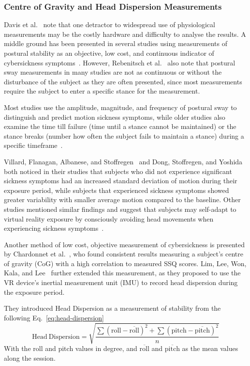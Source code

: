 \subsubsection{Centre of Gravity and Head Dispersion Measurements}\label{subsubsec:centre-of-gravity-and-head-dispersion-measurements}

Davis et al.~\cite{Davis2014} note that one detractor to widespread use of physiological measurements may be the
costly hardware and difficulty to analyse the results.
A middle ground has been presented in several studies using measurements of postural stability as an objective, low
cost, and continuous indicator of cybersickness symptoms~\cite{Rebenitsch2016}.
However, Rebenitsch et al.~\cite{Rebenitsch2016} also note that postural sway measurements in many studies are not as
continuous or without the disturbance of the subject as they are often presented, since most measurements require the
subject to enter a specific stance for the measurement.

Most studies use the amplitude, magnitude, and frequency of postural sway to distinguish and predict motion sickness
symptoms, while older studies also examine the time till failure (time until a stance cannot be maintained) or the
stance breaks (number how often the subject fails to maintain a stance) during a specific
timeframe~\cite{Rebenitsch2016}.

Villard, Flanagan, Albanese, and Stoffregen~\cite{Villard2008} and Dong, Stoffregen, and
Yoshida~\cite{Dong2011, Dong2010} both noticed in their studies that subjects who did not experience significant
sickness symptoms had an increased standard deviation of motion during their exposure period, while subjects that
experienced sickness symptoms showed greater variability with smaller average motion compared to the baseline.
Other studies mentioned similar findings and suggest that subjects may self-adapt to virtual reality exposure by
consciously avoiding head movements when experiencing sickness symptoms~\cite{Rebenitsch2016}.

Another method of low cost, objective measurement of cybersickness is presented by Chardonnet et
al.~\cite{Chardonnet2015}, who found consistent results measuring a subject's centre of gravity (CoG) with a high
correlation to measured SSQ scores.
Lim, Lee, Won, Kala, and Lee~\cite{Lim2020} further extended this measurement, as they proposed to use the VR device's
inertial measurement unit (IMU) to record head dispersion during the exposure period.

They introduced Head Dispersion as a measurement of stability from the following Eq.~\ref{eq:head-dispersion}
\begin{equation}
    \label{eq:head-dispersion}
    \mathrm{Head\ Dispersion} = \sqrt{\frac{\sum(\mathrm{roll} - \overline{\mathrm{roll}})^2 + \sum{(\mathrm{pitch} -
    \overline{\mathrm{pitch}})^2}}{n}}
\end{equation}
With the roll and pitch values in degree, and $\overline{\mathrm{roll}}$ and $\overline{\mathrm{pitch}}$ as the mean
values along the session.

